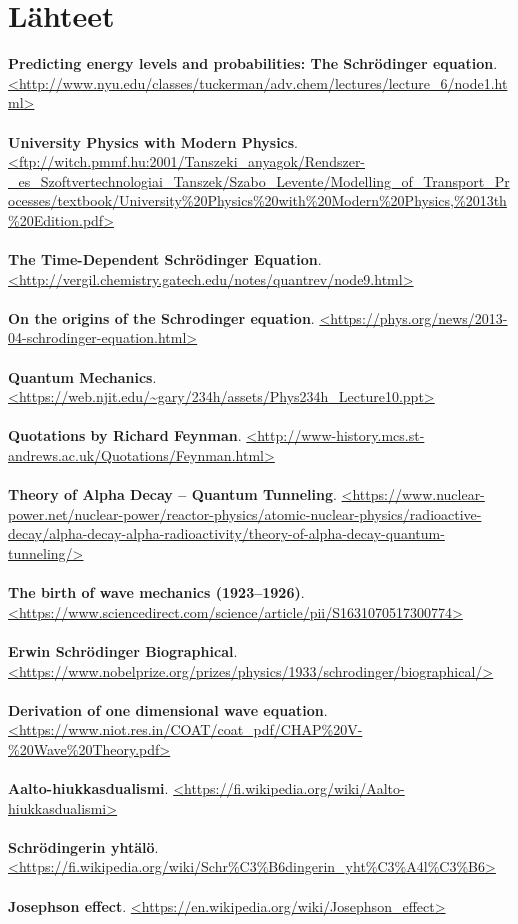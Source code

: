 \documentclass{article}
\begin{document}
\newpage
\section*{Lähteet}

\textbf{Predicting energy levels and probabilities: The Schrödinger equation}. \url{<http://www.nyu.edu/classes/tuckerman/adv.chem/lectures/lecture_6/node1.html>}\\
 \\
\textbf{University Physics with Modern Physics}. \url{<ftp://witch.pmmf.hu:2001/Tanszeki_anyagok/Rendszer-_es_Szoftvertechnologiai_Tanszek/Szabo_Levente/Modelling_of_Transport_Processes/textbook/University%20Physics%20with%20Modern%20Physics,%2013th%20Edition.pdf>}\\
 \\
\textbf{The Time-Dependent Schrödinger Equation}. \url{<http://vergil.chemistry.gatech.edu/notes/quantrev/node9.html>}\\
 \\
\textbf{On the origins of the Schrodinger equation}. \url{<https://phys.org/news/2013-04-schrodinger-equation.html>}\\
 \\
\textbf{Quantum Mechanics}. \url{<https://web.njit.edu/~gary/234h/assets/Phys234h_Lecture10.ppt>}\\
 \\
\textbf{Quotations by Richard Feynman}. \url{<http://www-history.mcs.st-andrews.ac.uk/Quotations/Feynman.html>}\\
 \\
\textbf{Theory of Alpha Decay – Quantum Tunneling}. \url{<https://www.nuclear-power.net/nuclear-power/reactor-physics/atomic-nuclear-physics/radioactive-decay/alpha-decay-alpha-radioactivity/theory-of-alpha-decay-quantum-tunneling/>}\\
 \\
\textbf{The birth of wave mechanics (1923–1926)}. \url{<https://www.sciencedirect.com/science/article/pii/S1631070517300774>}\\
 \\
\textbf{Erwin Schrödinger Biographical}. \url{<https://www.nobelprize.org/prizes/physics/1933/schrodinger/biographical/>}\\
 \\
\textbf{Derivation of one dimensional wave equation}. \url{<https://www.niot.res.in/COAT/coat_pdf/CHAP%20V-%20Wave%20Theory.pdf>}\\
 \\
\textbf{Aalto-hiukkasdualismi}. \url{<https://fi.wikipedia.org/wiki/Aalto-hiukkasdualismi>}\\
 \\
\textbf{Schrödingerin yhtälö}.
\url{<https://fi.wikipedia.org/wiki/Schr%C3%B6dingerin_yht%C3%A4l%C3%B6>}\\
 \\
\textbf{Josephson effect}.
\url{<https://en.wikipedia.org/wiki/Josephson_effect>}
\end{document}
